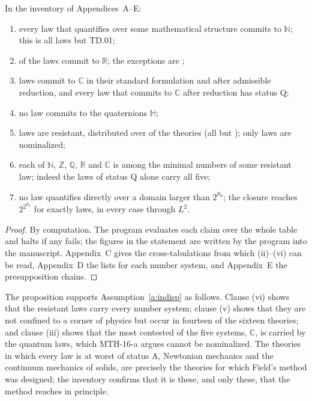 \documentclass{situationist-preprint}
\begin{document}
\begin{proposition}[Inventory]\label{p:inv}
In the inventory of Appendices~A--E:
\begin{enumerate}[label=(\roman*)]
\item every law that quantifies over some mathematical structure commits to $\mathbb N$; this is all laws but TD.01;
\item \nNumR{} of the \nLaws{} laws commit to $\mathbb R$; the exceptions are \listNoR;
\item \nNumC{} laws commit to $\mathbb C$ in their standard formulation and \nMinC{} after admissible reduction, and every law that commits to $\mathbb C$ after reduction has status Q;
\item no law commits to the quaternions $\mathbb H$;
\item \nResistant{} laws are resistant, distributed over \nResTheories{} of the \nTheories{} theories (all but \listInPrinciple); only \nNominalized{} laws are nominalized;
\item each of $\mathbb N$, $\mathbb Z$, $\mathbb Q$, $\mathbb R$ and $\mathbb C$ is among the minimal numbers of some resistant law; indeed the laws of status Q alone carry all five;
\item no law quantifies directly over a domain larger than $2^{\aleph_0}$; the closure reaches $2^{2^{\aleph_0}}$ for exactly \nClosTwoC{} laws, in every case through $L^2$.
\end{enumerate}
\end{proposition}

\begin{proof}
By computation. The program evaluates each claim over the whole table and halts if any fails; the figures in the statement are written by the program into the manuscript. Appendix~C gives the cross-tabulations from which (ii)--(vi) can be read, Appendix~D the lists for each number system, and Appendix~E the presupposition chains.
\end{proof}

The proposition supports Assumption~\ref{a:indisp} as follows. Clause (vi) shows that the resistant laws carry every number system; clause (v) shows that they are not confined to a corner of physics but occur in fourteen of the sixteen theories; and clause (iii) shows that the most contested of the five systems, $\mathbb C$, is carried by the quantum laws, which MTH-16-a argues cannot be nominalized. The theories in which every law is at worst of status A, Newtonian mechanics and the continuum mechanics of solids, are precisely the theories for which Field's method was designed; the inventory confirms that it is these, and only these, that the method reaches in principle.
\end{document}
